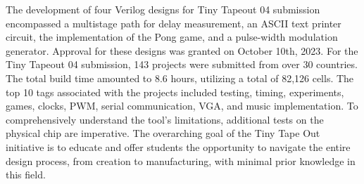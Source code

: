 

The development of four Verilog designs for Tiny Tapeout 04 submission encompassed a multistage path for delay measurement, an ASCII text printer circuit, the implementation of the Pong game, and a pulse-width modulation generator. Approval for these designs was granted on October 10th, 2023. For the Tiny Tapeout 04 submission, 143 projects were submitted from over 30 countries. The total build time amounted to 8.6 hours, utilizing a total of 82,126 cells. The top 10 tags associated with the projects included testing, timing, experiments, games, clocks, PWM, serial communication, VGA, and music implementation. To comprehensively understand the tool's limitations, additional tests on the physical chip are imperative. The overarching goal of the Tiny Tape Out initiative is to educate and offer students the opportunity to navigate the entire design process, from creation to manufacturing, with minimal prior knowledge in this field.